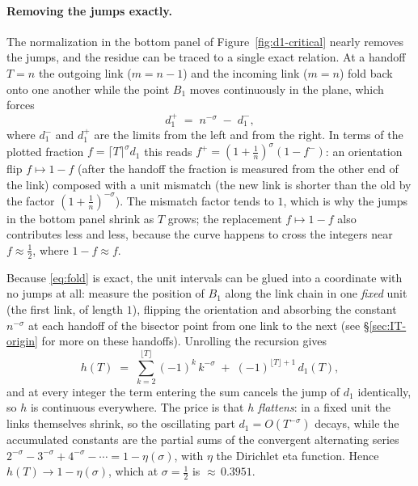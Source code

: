 \documentclass[11pt]{article}
\theoremstyle{definition}
\begin{document}
\paragraph{Removing the jumps exactly.} The normalization in the bottom panel
of Figure~\ref{fig:d1-critical} nearly removes the jumps, and the residue can
be traced to a single exact relation. At a handoff $T=n$ the outgoing link
($m=n-1$) and the incoming link ($m=n$) fold back onto one another while the
point $B_1$
moves continuously in the plane, which forces
\begin{equation}\label{eq:fold}
d_1^{+} \;=\; n^{-\sigma} \;-\; d_1^{-},
\end{equation}
where $d_1^{-}$ and $d_1^{+}$ are the limits from the left and from the right.
In terms of the plotted fraction $f=\lceil T\rceil^{\sigma} d_1$ this reads
$f^{+}=(1+\tfrac1n)^{\sigma}(1-f^{-})$: an orientation flip $f\mapsto 1-f$
(after the handoff the fraction is measured from the other end of the link)
composed with a unit mismatch (the new link is shorter than the old by the
factor $(1+\tfrac1n)^{-\sigma}$). The mismatch factor tends to $1$, which is
why the jumps in the bottom panel shrink as $T$ grows; the replacement
$f\mapsto 1-f$ also contributes less and less, because the curve happens to
cross the integers near $f\approx\tfrac12$, where $1-f\approx f$.

Because \eqref{eq:fold} is exact, the unit intervals can be glued into a
coordinate with no jumps at all: measure the position of $B_1$
along the link chain in one \emph{fixed} unit (the first link, of length
$1$), flipping the orientation and absorbing the constant $n^{-\sigma}$ at
each handoff of the bisector point from one link to the next (see
\S\ref{sec:IT-origin} for more on these handoffs). Unrolling the
recursion gives
\begin{equation}\label{eq:h-cont}
h(T) \;=\; \sum_{k=2}^{\lfloor T\rfloor} (-1)^{k}\,k^{-\sigma}
\;+\; (-1)^{\lfloor T\rfloor+1}\, d_1(T),
\end{equation}
and at every integer the term entering the sum cancels the jump of $d_1$
identically, so $h$ is continuous everywhere. The price is that $h$
\emph{flattens}: in a fixed unit the links themselves shrink, so the
oscillating part $d_1=O(T^{-\sigma})$ decays, while the accumulated constants
are the partial sums of the convergent alternating series
$2^{-\sigma}-3^{-\sigma}+4^{-\sigma}-\cdots = 1-\eta(\sigma)$, with $\eta$ the
Dirichlet eta function. Hence $h(T)\to 1-\eta(\sigma)$, which at
$\sigma=\tfrac12$ is ${\approx}\,0.3951$.
\end{document}
